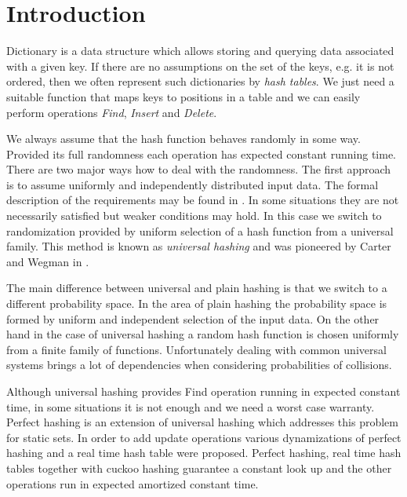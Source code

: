 \section{Introduction}
Dictionary is a data structure which allows storing and querying data associated with a given key. If there are no assumptions on the set of the keys, e.g. it is not ordered, then we often represent such dictionaries by \emph{hash tables}. We just need a suitable function that maps keys to positions in a table and we can easily perform operations \emph{Find}, \emph{Insert} and \emph{Delete}. 

We always assume that the hash function behaves randomly in some way. Provided its full randomness each operation has expected constant running time. There are two major ways how to deal with the randomness. The first approach is to assume uniformly and independently distributed input data. The formal description of the requirements may be found in \cite{DBLP:books/sp/Mehlhorn84}. In some situations they are not necessarily satisfied but weaker conditions may hold. In this case we switch to randomization provided by uniform selection of a hash function from a universal family. This method is known as \emph{universal hashing} and was pioneered by Carter and Wegman in \cite{DBLP:journals/jcss/CarterW79}. 

The main difference between universal and plain hashing is that we switch to a different probability space. In the area of plain hashing the probability space is formed by uniform and independent selection of the input data. On the other hand in the case of universal hashing a random hash function is chosen uniformly from a finite family of functions. Unfortunately dealing with common universal systems brings a lot of dependencies when considering probabilities of collisions.

Although universal hashing provides Find operation running in expected constant time, in some situations it is not enough and we need a worst case warranty. Perfect hashing \cite{Fredman:1984:SST:828.1884} is an extension of universal hashing which addresses this problem for static sets. In order to add update operations various dynamizations of perfect hashing \cite{DBLP:journals/siamcomp/DietzfelbingerKMHRT94} and a real time hash table \cite{DBLP:conf/icalp/DietzfelbingerH90} were proposed. Perfect hashing, real time hash tables together with cuckoo hashing \cite{DBLP:conf/esa/PaghR01} guarantee a constant look up and the other operations run in expected amortized constant time.


